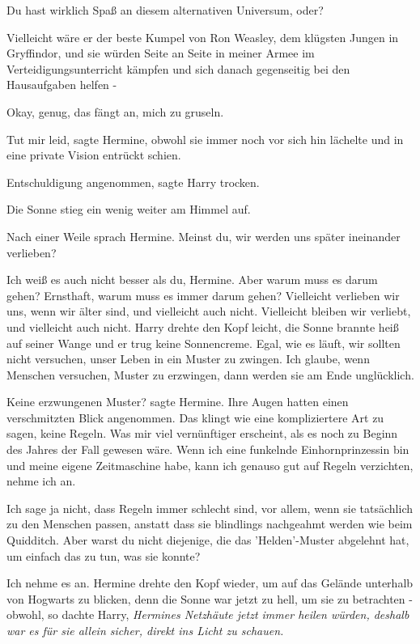 \glqq{}Du hast wirklich Spaß an diesem alternativen Universum, oder?\grqq{}

\glqq{}Vielleicht wäre er der beste Kumpel von Ron Weasley, dem klügsten Jungen
in Gryffindor, und sie würden Seite an Seite in meiner Armee im
Verteidigungsunterricht kämpfen und sich danach gegenseitig bei den Hausaufgaben
helfen -\grqq{}

\glqq{}Okay, genug, das fängt an, mich zu gruseln.\grqq{}

\glqq{}Tut mir leid\grqq{}, sagte Hermine, obwohl sie immer noch vor sich hin
lächelte und in eine private Vision entrückt schien.

\glqq{}Entschuldigung angenommen\grqq{}, sagte Harry trocken.

Die Sonne stieg ein wenig weiter am Himmel auf.

Nach einer Weile sprach Hermine. \glqq{}Meinst du, wir werden uns später
ineinander verlieben?\grqq{}

\glqq{}Ich weiß es auch nicht besser als du, Hermine. Aber warum muss es darum
gehen? Ernsthaft, warum muss es immer darum gehen? Vielleicht verlieben wir uns,
wenn wir älter sind, und vielleicht auch nicht. Vielleicht bleiben wir verliebt,
und vielleicht auch nicht.\grqq{} Harry drehte den Kopf leicht, die Sonne brannte heiß
auf seiner Wange und er trug keine Sonnencreme. \glqq{}Egal, wie es läuft, wir
sollten nicht versuchen, unser Leben in ein Muster zu zwingen. Ich glaube, wenn
Menschen versuchen, Muster zu erzwingen, dann werden sie am Ende unglücklich.\grqq{}

\glqq{}Keine erzwungenen Muster?\grqq{} sagte Hermine. Ihre Augen hatten einen
verschmitzten Blick angenommen. \glqq{}Das klingt wie eine kompliziertere Art zu
sagen, keine Regeln. Was mir viel vernünftiger erscheint, als es noch zu Beginn
des Jahres der Fall gewesen wäre. Wenn ich eine funkelnde Einhornprinzessin bin
und meine eigene Zeitmaschine habe, kann ich genauso gut auf Regeln verzichten,
nehme ich an.\grqq{}

\glqq{}Ich sage ja nicht, dass Regeln immer schlecht sind, vor allem, wenn sie
tatsächlich zu den Menschen passen, anstatt dass sie blindlings nachgeahmt
werden wie beim Quidditch. Aber warst du nicht diejenige, die das
'Helden'-Muster abgelehnt hat, um einfach das zu tun, was sie konnte?\grqq{}

\glqq{}Ich nehme es an.\grqq{} Hermine drehte den Kopf wieder, um auf das Gelände
unterhalb von Hogwarts zu blicken, denn die Sonne war jetzt zu hell, um sie zu
betrachten - obwohl, so dachte Harry, \emph{Hermines Netzhäute jetzt immer
heilen würden, deshalb war es für sie allein sicher, direkt ins Licht zu
schauen.}

